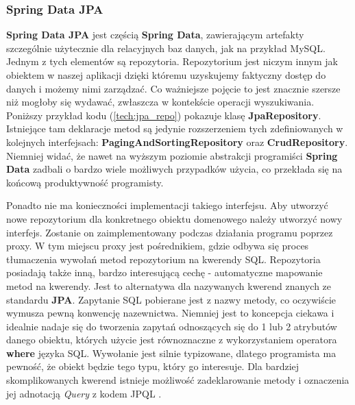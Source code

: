 		\subsubsection{Spring Data JPA}
		\label{tech:spring_data_jpa}
		\textbf{Spring Data JPA} jest częścią \textbf{Spring Data}, zawierającym artefakty szczególnie użytecznie dla relacyjnych baz danych, jak na przykład MySQL. Jednym z tych elementów są repozytoria. Repozytorium jest niczym innym jak obiektem w naszej aplikacji dzięki któremu uzyskujemy faktyczny dostęp do danych i możemy nimi zarządzać. Co ważniejsze pojęcie to jest znacznie szersze niż mogłoby się wydawać, zwłaszcza w kontekście operacji wyszukiwania. Poniższy przykład kodu (\ref{tech:jpa_repo}) pokazuje klasę \textbf{JpaRepository}. Istniejące tam deklaracje metod są jedynie rozszerzeniem tych zdefiniowanych w kolejnych interfejsach: \textbf{PagingAndSortingRepository} oraz \textbf{CrudRepository}. Niemniej widać, że nawet na wyższym poziomie abstrakcji programiści \textbf{Spring Data} zadbali o bardzo wiele możliwych przypadków użycia, co przekłada się na końcową produktywność programisty. 
		Ponadto nie ma konieczności implementacji takiego interfejsu. Aby utworzyć nowe repozytorium dla konkretnego obiektu domenowego należy utworzyć nowy interfejs. Zostanie on zaimplementowany podczas działania programu poprzez proxy. W tym miejscu proxy jest pośrednikiem, gdzie odbywa się proces tłumaczenia wywołań metod repozytorium na kwerendy SQL. Repozytoria posiadają także inną, bardzo interesującą cechę - automatyczne mapowanie metod na kwerendy. Jest to alternatywa dla nazywanych kwerend znanych ze standardu \textbf{JPA}. Zapytanie SQL pobierane jest z nazwy metody, co oczywiście wymusza pewną konwencję nazewnictwa. Niemniej jest to koncepcja ciekawa i idealnie nadaje się do tworzenia zapytań odnoszących się do 1 lub 2 atrybutów danego obiektu, których użycie jest równoznaczne z wykorzystaniem operatora \textbf{where} języka SQL. Wywołanie jest silnie typizowane, dlatego programista ma pewność, że obiekt będzie tego typu, który go interesuje. Dla bardziej skomplikowanych kwerend istnieje możliwość zadeklarowanie metody i oznaczenia jej adnotacją \textit{\@{}Query} z kodem JPQL \cite{jpql} \cite{spring_data}.
			

